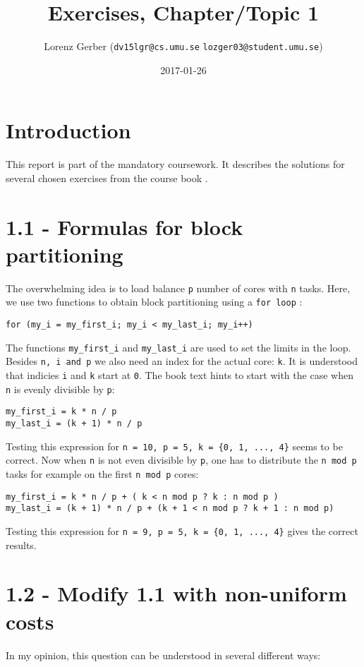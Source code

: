 \documentclass[a4paper,11pt,twoside]{article}
\title{Exercises, Chapter/Topic 1}
\author{Lorenz Gerber ({\tt{dv15lgr@cs.umu.se}} {\tt{lozger03@student.umu.se}})}
\date{2017-01-26}
\begin{document}
\lstset{language=C}
\maketitle
\thispagestyle{empty}
\newpage
\tableofcontents
\thispagestyle{empty}
\newpage

\clearpage
{}

\section{Introduction}
This report is part of the mandatory coursework. It describes the solutions for several chosen exercises from the course book \cite{pacheco2011}.
\section{1.1 - Formulas for block partitioning}
The overwhelming idea is to load balance \verb+p+ number of cores with \verb+n+ tasks. Here, we use two functions to obtain block partitioning using a \verb+for loop+ :
\begin{verbatim}
for (my_i = my_first_i; my_i < my_last_i; my_i++)
\end{verbatim}

The functions \verb+my_first_i+ and \verb+my_last_i+ are used to set the limits in the loop. Besides \verb+n, i and p+ we also need an index for the actual core: \verb+k+. It is understood that indicies \verb+i+ and \verb+k+ start at \verb+0+. The book text hints to start with the case when \verb+n+ is evenly divisible by \verb+p+:
\begin{verbatim}
my_first_i = k * n / p
my_last_i = (k + 1) * n / p
\end{verbatim}
Testing this expression for \verb!n = 10, p = 5, k = {0, 1, ..., 4}! seems to be correct. Now when  \verb+n+ is not even divisible by \verb+p+, one has to distribute the \verb+n mod p+ tasks for example on the first \verb+n mod p+ cores:
\begin{verbatim}
my_first_i = k * n / p + ( k < n mod p ? k : n mod p )
my_last_i = (k + 1) * n / p + (k + 1 < n mod p ? k + 1 : n mod p)  
\end{verbatim}
Testing this expression for \verb!n = 9, p = 5, k = {0, 1, ..., 4}! gives the correct results.
  
\section{1.2 - Modify 1.1 with non-uniform costs}
In my opinion, this question can be understood in several different ways:
\end{document}
